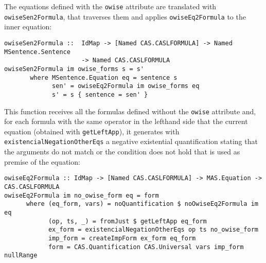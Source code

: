 The equations defined with the \verb"owise" attribute are translated
with \verb"owiseSen2Formula", that traverses them and applies
\verb"owiseEq2Formula" to the inner equation:

{\codesize
\begin{verbatim}
owiseSen2Formula ::  IdMap -> [Named CAS.CASLFORMULA] -> Named MSentence.Sentence 
                     -> Named CAS.CASLFORMULA
owiseSen2Formula im owise_forms s = s'
       where MSentence.Equation eq = sentence s
             sen' = owiseEq2Formula im owise_forms eq
             s' = s { sentence = sen' }
\end{verbatim}
}

This function receives all the formulas defined without the \verb"owise"
attribute and, for each formula with the same operator in the lefthand
side that the current equation (obtained with \verb"getLeftApp"), it
generates with \verb"existencialNegationOtherEqs" a negative existential
quantification stating that the arguments do not match or the condition
does not hold that is used as premise of the equation:

{\codesize
\begin{verbatim}
owiseEq2Formula :: IdMap -> [Named CAS.CASLFORMULA] -> MAS.Equation -> CAS.CASLFORMULA
owiseEq2Formula im no_owise_form eq = form
      where (eq_form, vars) = noQuantification $ noOwiseEq2Formula im eq
            (op, ts, _) = fromJust $ getLeftApp eq_form
            ex_form = existencialNegationOtherEqs op ts no_owise_form
            imp_form = createImpForm ex_form eq_form
            form = CAS.Quantification CAS.Universal vars imp_form nullRange
\end{verbatim}
}



